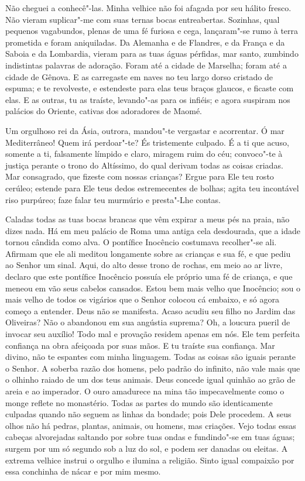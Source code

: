 Não cheguei a conhecê"-las. Minha velhice não foi afagada por seu hálito
fresco. Não vieram suplicar"-me com suas ternas bocas entreabertas.
Sozinhas, qual pequenos vagabundos, plenas de uma fé furiosa e cega,
lançaram"-se rumo à terra prometida e foram aniquiladas. Da Alemanha e de
Flandres, e da França e da Saboia e da Lombardia, vieram para as tuas
águas pérfidas, mar santo, zumbindo indistintas palavras de adoração.
Foram até a cidade de Marselha; foram até a cidade de Gênova. E as
carregaste em naves no teu largo dorso cristado de espuma; e te
revolveste, e estendeste para elas teus braços glaucos, e ficaste com
elas. E as outras, tu as traíste, levando"-as para os infiéis; e agora
suspiram nos palácios do Oriente, cativas dos adoradores de Maomé.

Um orgulhoso rei da Ásia, outrora, mandou"-te vergastar e
acorrentar. Ó mar
Mediterrâneo! Quem irá perdoar"-te? És tristemente culpado. É a ti que
acuso, somente a ti, falsamente límpido e claro, miragem ruim do céu;
convoco"-te à justiça perante o trono do Altíssimo, do qual derivam todas
as coisas criadas. Mar consagrado, que fizeste com nossas crianças? Ergue
para Ele teu rosto cerúleo; estende para Ele teus dedos estremecentes de
bolhas; agita teu incontável riso purpúreo; faze falar teu murmúrio e
presta"-Lhe contas.

Caladas todas as tuas bocas brancas que vêm expirar a meus pés na praia,
não dizes nada. Há em meu palácio de Roma uma antiga cela desdourada, que
a idade tornou cândida como alva. O pontífice Inocêncio costumava
recolher"-se ali. Afirmam que ele ali meditou longamente sobre as crianças
e sua fé, e que pediu ao Senhor um sinal. Aqui, do alto desse trono de
rochas, em meio ao ar livre, declaro que este pontífice Inocêncio possuía
ele próprio uma fé de criança, e que meneou em vão seus cabelos cansados.
Estou bem mais velho que Inocêncio; sou o mais velho de todos os vigários
que o Senhor colocou cá embaixo, e só agora começo a entender. Deus não se
manifesta. Acaso acudiu seu filho no Jardim das Oliveiras? Não o abandonou
em sua angústia suprema? Oh, a loucura pueril de invocar seu auxílio! Todo
mal e provação residem apenas em nós. Ele tem perfeita confiança na obra
afeiçoada por suas mãos. E tu traíste sua confiança. Mar divino, não te
espantes com minha linguagem. Todas as coisas são iguais perante o Senhor.
A soberba razão dos homens, pelo padrão do infinito, não vale mais que o
olhinho raiado de um dos teus animais. Deus concede igual quinhão ao grão
de areia e ao imperador. O ouro amadurece na mina tão impecavelmente como
o monge reflete no monastério. Todas as partes do mundo são identicamente
culpadas quando não seguem as linhas da bondade; pois Dele procedem. A
seus olhos não há pedras, plantas, animais, ou homens, mas criações. Vejo
todas essas cabeças alvorejadas saltando por sobre tuas ondas e
fundindo"-se em tuas águas; surgem por um só segundo sob a luz do sol, e
podem ser danadas ou eleitas. A extrema velhice instrui o orgulho e
ilumina a religião. Sinto igual compaixão por essa conchinha de nácar e
por mim mesmo.

